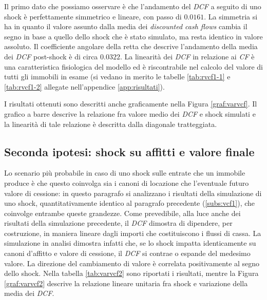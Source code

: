 Il primo dato che possiamo osservare è che l'andamento del \textit{DCF} a seguito di uno shock è perfettamente simmetrico e lineare, con passo di $0.0161$. La simmetria si ha in quanto il valore assunto dalla media dei {\itshape discounted cash flows} cambia il segno in base a quello dello shock che è stato simulato, ma resta identico in valore assoluto. Il coefficiente angolare della retta che descrive l'andamento della media dei \textit{DCF} post-shock è di circa $0.0322$. 
La linearità dei \textit{DCF} in relazione ai \textit{CF} è una caratteristica fisiologica del modello  ed è riscontrabile nel calcolo del valore di tutti gli immobili in esame (si vedano in merito le tabelle \ref{tab:rvcf1-1} e \ref{tab:rvcf1-2} allegate nell'appendice \ref{app:risultati}).

I risultati ottenuti sono descritti anche graficamente nella Figura \ref{graf:varvcf}.
Il grafico a barre descrive la relazione fra valore medio dei \textit{DCF} e shock simulati e la linearità di tale relazione è descritta dalla diagonale tratteggiata.


\subsection{Seconda ipotesi: shock su affitti e valore finale}
\label{subs:vcf2}
Lo scenario più probabile in caso di uno shock sulle entrate che un immobile produce è che questo coinvolga sia i canoni di locazione che l'eventuale futuro valore di cessione: in questo paragrafo si analizzano i risultati della simulazione di uno shock, quantitativamente identico al paragrafo precedente (\ref{subs:vcf1}), che coinvolge entrambe queste grandezze.
Come prevedibile, alla luce anche dei risultati della simulazione precedente, il \textit{DCF} dimostra di dipendere, per costruzione, in maniera lineare dagli importi che costituiscono i flussi di cassa. La simulazione in analisi dimostra infatti che, se lo shock impatta identicamente su canoni d'affitto e valore di cessione, il \textit{DCF} si contrae o espande del medesimo valore. La direzione del cambiamento di valore è correlata positivamente al segno dello shock. Nella tabella \ref{tab:varvcf2} sono riportati i risultati, mentre la Figura \ref{graf:varvcf2} descrive la relazione lineare unitaria fra shock e variazione della media dei \textit{DCF}. 



